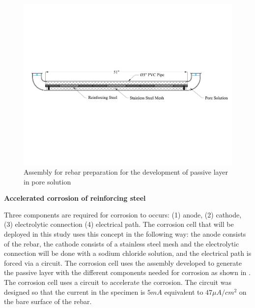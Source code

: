 \begin{figure}[htbp]
	\centering
	\includegraphics[width=1.0\textwidth]{Chapter-3/figs/AnodicPolarization_01}
	\caption{Assembly for rebar preparation for the development of passive layer in pore solution}
	\label{fig:RebarPassivation}
\end{figure}

\newpage
\textbf{Accelerated corrosion  of reinforcing steel}

Three components are required for corrosion to occurs: (1) anode, (2) cathode, (3) electrolytic connection (4) electrical path. The corrosion cell that will be deployed in this study uses this concept in the following way: the anode consists of the rebar, the cathode consists of a stainless steel mesh and the electrolytic connection will be done with a sodium chloride solution, and the electrical path is forced via a circuit. The corrosion cell uses the assembly developed to generate the passive layer with the different components needed for corrosion as shown in . The corrosion cell uses a circuit to accelerate the corrosion. The circuit was designed so that the current in the specimen is $5mA$ equivalent to $47\mu A/cm^2$ on the bare surface of the rebar.

